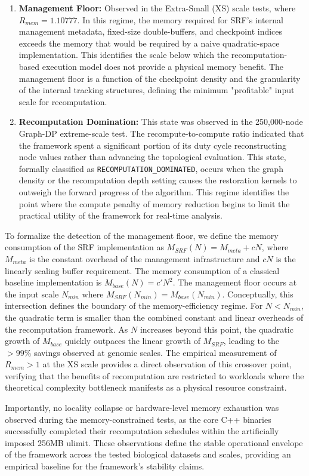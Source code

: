 \begin{enumerate}
    \item \textbf{Management Floor:} Observed in the Extra-Small (XS) scale tests, where $R_{mem} = 1.10777$. In this regime, the memory required for SRF's internal management metadata, fixed-size double-buffers, and checkpoint indices exceeds the memory that would be required by a naive quadratic-space implementation. This identifies the scale below which the recomputation-based execution model does not provide a physical memory benefit. The management floor is a function of the checkpoint density and the granularity of the internal tracking structures, defining the minimum "profitable" input scale for recomputation.
    \item \textbf{Recomputation Domination:} This state was observed in the 250,000-node Graph-DP extreme-scale test. The recompute-to-compute ratio indicated that the framework spent a significant portion of its duty cycle reconstructing node values rather than advancing the topological evaluation. This state, formally classified as \texttt{RECOMPUTATION\_DOMINATED}, occurs when the graph density or the recomputation depth setting causes the restoration kernels to outweigh the forward progress of the algorithm. This regime identifies the point where the compute penalty of memory reduction begins to limit the practical utility of the framework for real-time analysis.
\end{enumerate}

To formalize the detection of the management floor, we define the memory consumption of the SRF implementation as $M_{SRF}(N) = M_{meta} + cN$, where $M_{meta}$ is the constant overhead of the management infrastructure and $cN$ is the linearly scaling buffer requirement. The memory consumption of a classical baseline implementation is $M_{base}(N) = c' N^2$. The management floor occurs at the input scale $N_{min}$ where $M_{SRF}(N_{min}) = M_{base}(N_{min})$. Conceptually, this intersection defines the boundary of the memory-efficiency regime. For $N < N_{min}$, the quadratic term is smaller than the combined constant and linear overheads of the recomputation framework. As $N$ increases beyond this point, the quadratic growth of $M_{base}$ quickly outpaces the linear growth of $M_{SRF}$, leading to the $>99\%$ savings observed at genomic scales. The empirical measurement of $R_{mem} > 1$ at the XS scale provides a direct observation of this crossover point, verifying that the benefits of recomputation are restricted to workloads where the theoretical complexity bottleneck manifests as a physical resource constraint.

Importantly, no locality collapse or hardware-level memory exhaustion was observed during the memory-constrained tests, as the core C++ binaries successfully completed their recomputation schedules within the artificially imposed 256MB ulimit. These observations define the stable operational envelope of the framework across the tested biological datasets and scales, providing an empirical baseline for the framework's stability claims.
